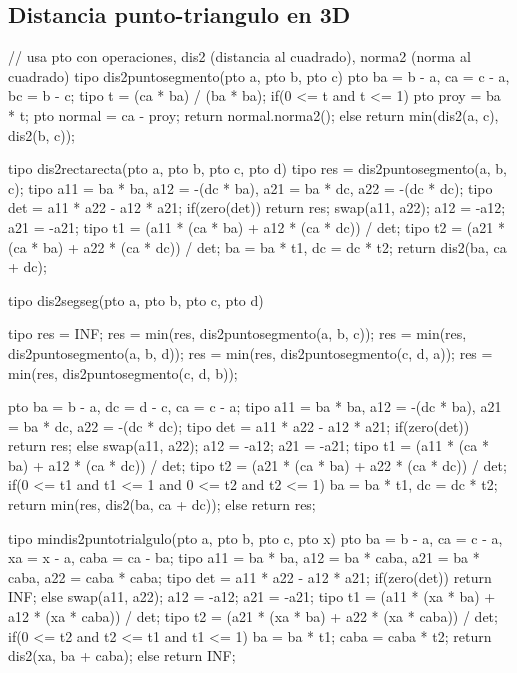 \documentclass[10pt,landscape,twocolumn,a4paper,notitlepage]{article}
\begin{document}
\subsection{Distancia punto-triangulo en 3D}
\begin{code}
// usa pto con operaciones, dis2 (distancia al cuadrado), norma2 (norma al cuadrado)
tipo dis2puntosegmento(pto a, pto b, pto c) {
    pto ba = b - a, ca = c - a, bc = b - c;
    tipo t = (ca * ba) / (ba * ba);
    if(0 <= t and t <= 1) {
        pto proy = ba * t;
        pto normal = ca - proy;
        return normal.norma2();
    }
    else return min(dis2(a, c), dis2(b, c));
}

tipo dis2rectarecta(pto a, pto b, pto c, pto d) {
    tipo res = dis2puntosegmento(a, b, c);
    tipo a11 = ba * ba, a12 = -(dc * ba), a21 = ba * dc, a22 = -(dc * dc);
    tipo det = a11 * a22 - a12 * a21;
    if(zero(det)) return res;
    swap(a11, a22); a12 = -a12; a21 = -a21;
    tipo t1 = (a11 * (ca * ba) + a12 * (ca * dc)) / det;
    tipo t2 = (a21 * (ca * ba) + a22 * (ca * dc)) / det;
    ba = ba * t1, dc = dc * t2;
    return dis2(ba, ca + dc);
}

tipo dis2segseg(pto a, pto b, pto c, pto d) {
    tipo res = INF;
    res = min(res, dis2puntosegmento(a, b, c));
    res = min(res, dis2puntosegmento(a, b, d));
    res = min(res, dis2puntosegmento(c, d, a));
    res = min(res, dis2puntosegmento(c, d, b));
    
    pto ba = b - a, dc = d - c, ca = c - a;
    tipo a11 = ba * ba, a12 = -(dc * ba), a21 = ba * dc, a22 = -(dc * dc);
    tipo det = a11 * a22 - a12 * a21;
    if(zero(det)) return res;
    else {
        swap(a11, a22); a12 = -a12; a21 = -a21;
        tipo t1 = (a11 * (ca * ba) + a12 * (ca * dc)) / det;
        tipo t2 = (a21 * (ca * ba) + a22 * (ca * dc)) / det;
        if(0 <= t1 and t1 <= 1 and 0 <= t2 and t2 <= 1) {
            ba = ba * t1, dc = dc * t2;
            return min(res, dis2(ba, ca + dc));
        }
        else return res;
    }
}

tipo mindis2puntotrialgulo(pto a, pto b, pto c, pto x) {
    pto ba = b - a, ca = c - a, xa = x - a, caba = ca - ba;
    tipo a11 = ba * ba, a12 = ba * caba, a21 = ba * caba, a22 = caba * caba;
    tipo det = a11 * a22 - a12 * a21;
    if(zero(det)) return INF;
    else {
        swap(a11, a22); a12 = -a12; a21 = -a21;
        tipo t1 = (a11 * (xa * ba) + a12 * (xa * caba)) / det;
        tipo t2 = (a21 * (xa * ba) + a22 * (xa * caba)) / det;
        if(0 <= t2 and t2 <= t1 and t1 <= 1) {
            ba = ba * t1; caba = caba * t2;
            return dis2(xa, ba + caba);
        }
        else return INF;
    }
}
\end{code}
\end{document}
